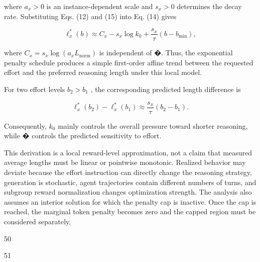\documentclass[
  10
]{article}
\begin{document}
where \(a _ { x } > 0\) is an instance-dependent scale and
\(s _ { x } > 0\) determines the decay rate. Substituting Eqs. (12) and
(15) into Eq. (14) gives

\[
\ell _ { x } ^ { \ast } ( b ) \approx C _ { x } - s _ { x } \log k _ { 0 } + \frac { s _ { x } } { \tau } ( b - b _ { \mathrm { m i n } } ) ,\tag{16}
\]

where
\(C _ { x } = s _ { x } \log ( a _ { x } L _ { \mathrm { n o r m } } )\)
is independent of �. Thus, the exponential penalty schedule produces a
simple first-order affine trend between the requested effort and the
preferred reasoning length under this local model.

For two effort levels \(b _ { 2 } > b _ { 1 }\) , the corresponding
predicted length difference is

\[
\ell _ { x } ^ { \ast } ( b _ { 2 } ) - \ell _ { x } ^ { \ast } ( b _ { 1 } ) \approx \frac { s _ { x } } { \tau } ( b _ { 2 } - b _ { 1 } ) .\tag{17}
\]

Consequently, \(k _ { 0 }\) mainly controls the overall pressure toward
shorter reasoning, while � controls the predicted sensitivity to effort.

This derivation is a local reward-level approximation, not a claim that
measured average lengths must be linear or pointwise monotonic. Realized
behavior may deviate because the effort instruction can directly change
the reasoning strategy, generation is stochastic, agent trajectories
contain different numbers of turns, and subgroup reward normalization
changes optimization strength. The analysis also assumes an interior
solution for which the penalty cap is inactive. Once the cap is reached,
the marginal token penalty becomes zero and the capped region must be
considered separately.

50

51
\end{document}
